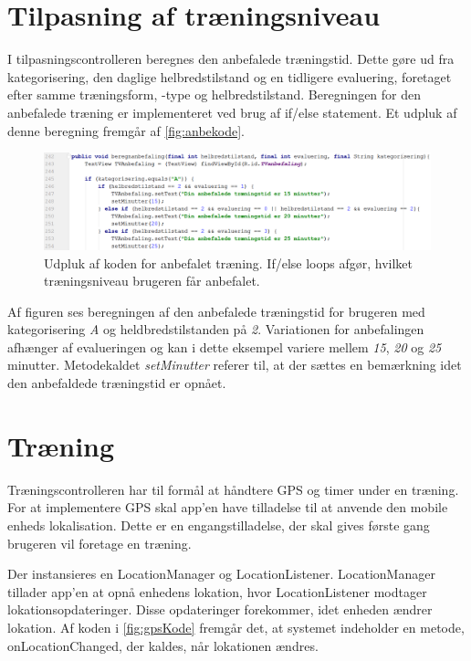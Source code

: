 \section{Tilpasning af træningsniveau}
I tilpasningscontrolleren beregnes den anbefalede træningstid. Dette gøre ud fra kategorisering, den daglige helbredstilstand og en tidligere evaluering, foretaget efter samme træningsform, -type og helbredstilstand.
Beregningen for den anbefalede træning er implementeret ved brug af if/else statement. Et udpluk af denne beregning fremgår af \autoref{fig:anbekode}.  
   
\begin{figure} [H]
\centering
\includegraphics[width=1\textwidth]{figures/imple/anbekode}
\caption{Udpluk af koden for anbefalet træning. If/else loops afgør, hvilket træningsniveau brugeren får anbefalet.}
\label{fig:anbekode}
\end{figure} 

\noindent
Af figuren ses beregningen af den anbefalede træningstid for brugeren med kategorisering \textit{A} og heldbredstilstanden på \textit{2}. Variationen for anbefalingen afhænger af evalueringen og kan i dette eksempel variere mellem \textit{15}, \textit{20} og \textit{25}  minutter. Metodekaldet \textit{setMinutter} referer til, at der sættes en bemærkning idet den anbefaldede træningstid er opnået.

\section{Træning}
Træningscontrolleren har til formål at håndtere GPS og timer under en træning. For at implementere GPS skal app'en have tilladelse til at anvende den mobile enheds lokalisation. Dette er en engangstilladelse, der skal gives første gang brugeren vil foretage en træning. 

Der instansieres en LocationManager og LocationListener. LocationManager tillader app'en at opnå enhedens lokation, hvor LocationListener modtager lokationsopdateringer. Disse opdateringer forekommer, idet enheden ændrer lokation.\cite{LocationManager, LocationListener} Af koden i \autoref{fig:gpsKode} fremgår det, at systemet indeholder en metode, onLocationChanged, der kaldes, når lokationen ændres. 

